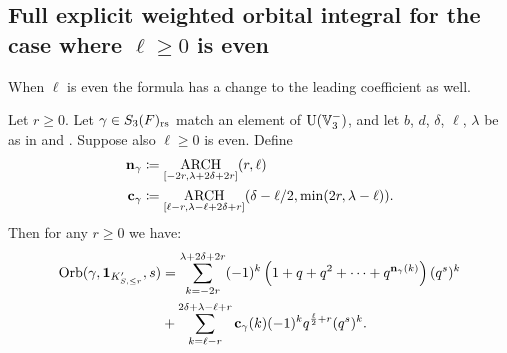 \subsection{Full explicit weighted orbital integral for the case where $\ell \ge 0$ is even}
When $\ell$ is even the formula has a change to the leading coefficient as well.
\begin{theorem}
  \label{thm:full_orbital_ell_even}
  Let $r \ge 0$.
  Let $\gamma \in S_3(F)_{\mathrm{rs}}$ match an element of $\operatorname{U}(\mathbb V_3^-)$,
  and let $b$, $d$, $\delta$, $\ell$, $\lambda$ be as in
   and .
  Suppose also $\ell \ge 0$ is even.
  Define
  \begin{align*}
    \mathbf n_\gamma &\coloneqq \operatorname*{ARCH}_{[-2r, \lambda + 2\delta + 2r]}(r, \ell) \\
    \mathbf c_\gamma &\coloneqq \operatorname*{ARCH}_{[\ell-r, \lambda - \ell + 2\delta + r]}
    (\delta - \ell/2, \min(2r, \lambda-\ell)).
  \end{align*}
  Then for any $r \ge 0$ we have:
  \begin{align*}
    \operatorname{Orb}(\gamma, \mathbf{1}_{K'_{S, \le r}}, s)
    &= \sum_{k = -2r}^{\lambda + 2\delta +  2r}
    (-1)^k \left( 1 + q + q^2 + \dots + q^{\mathbf n_{\gamma}(k)}  \right) (q^s)^k \\
    &+ \sum_{k = \ell-r}^{2\delta + \lambda - \ell + r} \mathbf c_\gamma(k) (-1)^k q^{\frac{\ell}{2}+r} (q^s)^k.
  \end{align*}
\end{theorem}

